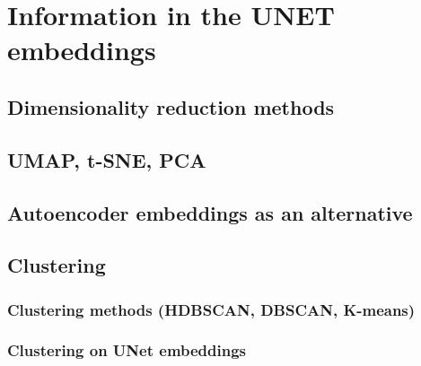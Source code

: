 \section{Information in the UNET embeddings}
    \subsection{Dimensionality reduction methods}
    \subsection{UMAP, t-SNE, PCA}
    \subsection{Autoencoder embeddings as an alternative}
        
    \clearpage
    \subsection{Clustering}
        \subsubsection{Clustering methods (HDBSCAN, DBSCAN, K-means)}
        \subsubsection{Clustering on UNet embeddings}
        